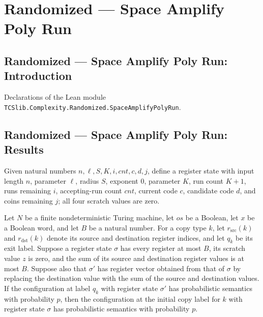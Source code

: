\section{Randomized --- Space Amplify Poly Run}
\subsection*{Randomized --- Space Amplify Poly Run: Introduction}

Declarations of the Lean module \texttt{TCSlib.Complexity.Randomized.SpaceAmplifyPolyRun}.

\subsection*{Randomized --- Space Amplify Poly Run: Results}

\begin{definition}
\label{Randomized.PolyAmp.mk}
\leanok
{}
Given natural numbers $n,\ell,S,K,i,cnt,c,d,j$, define a register state with input
length $n$, parameter $\ell$, radius $S$, exponent $0$, parameter $K$, run count $K+1$,
runs remaining $i$, accepting-run count $cnt$, current code $c$, candidate code $d$, and
coins remaining $j$; all four scratch values are zero.
\end{definition}

\begin{lemma}
\label{Randomized.PolyAmp.ps_cp}
\leanok
{}
Let $N$ be a finite nondeterministic Turing machine, let $os$ be a Boolean, let $x$ be a
Boolean word, and let $B$ be a natural number. For a copy type $k$, let
$r_{\mathrm{src}}(k)$ and $r_{\mathrm{dst}}(k)$ denote its source and destination
register indices, and let $q_k$ be its exit label. Suppose a register state $\sigma$ has
every register at most $B$, its scratch value $z$ is zero, and the sum of its source and
destination register values is at most $B$. Suppose also that $\sigma'$ has register
vector obtained from that of $\sigma$ by replacing the destination value with the sum of
the source and destination values. If the configuration at label $q_k$ with register
state $\sigma'$ has probabilistic semantics with probability $p$, then the configuration
at the initial copy label for $k$ with register state $\sigma$ has probabilistic
semantics with probability $p$.
\end{lemma}


